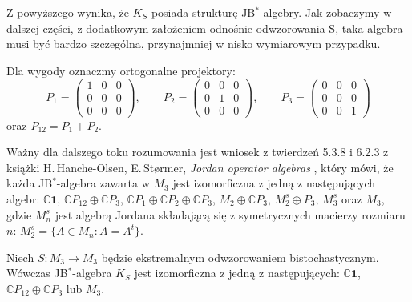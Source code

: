 Z powyższego wynika, że $K_{S}$ posiada strukturę JB$^{*}$-algebry.
Jak zobaczymy w dalszej części,
z dodatkowym założeniem odnośnie odwzorowania S,
taka algebra musi być bardzo szczególna,
przynajmniej w nisko wymiarowym przypadku.

Dla wygody oznaczmy ortogonalne projektory:
\begin{equation}
\label{def:OrthogonalProjections}
    P_{1} = \begin{pmatrix}
        1 & 0 & 0 \\
        0 & 0 & 0 \\
        0 & 0 & 0
    \end{pmatrix} , \quad \quad
    P_{2} = \begin{pmatrix}
        0 & 0 & 0 \\
        0 & 1 & 0 \\
        0 & 0 & 0
    \end{pmatrix} , \quad \quad
    P_{3} = \begin{pmatrix}
        0 & 0 & 0 \\
        0 & 0 & 0 \\
        0 & 0 & 1
    \end{pmatrix}
\end{equation}
oraz $P_{12} = P_{1} + P_{2}$.

Ważny dla dalszego toku rozumowania jest wniosek z twierdzeń 5.3.8 i 6.2.3
z książki
H.\,Hanche-Olsen, E.\,St{\o}rmer,
\emph{Jordan operator algebras} \cite{Hanche1984},
który mówi, że każda JB$^{*}$-algebra zawarta w $M_{3}$
jest izomorficzna z jedną z następujących algebr:
$\mathbb{C}\mathbf{1}$,
$\mathbb{C} P_{12} \oplus \mathbb{C} P_{3}$,
$\mathbb{C} P_{1} \oplus \mathbb{C} P_{2} \oplus \mathbb{C} P_{3}$,
$M_{2} \oplus \mathbb{C} P_{3}$,
$M_{2}^{s} \oplus P_{3}$,
$M_{3}^{s}$ oraz $M_{3}$,
gdzie $M_{n}^{s}$ jest algebrą Jordana składającą się z symetrycznych
macierzy rozmiaru $n$: $M_{2}^{s} = \{ A \in M_{n}: A = A^{t} \}$.

\begin{Theorem}
\label{thm:ExposedMaps}
Niech $S\!: M_{3} \rightarrow M_{3}$ będzie ekstremalnym odwzorowaniem
bistochastycznym.
Wówczas JB$^{*}$-algebra $K_{S}$ jest izomorficzna z jedną z następujących:
$\mathbb{C}\mathbf{1}$, $\mathbb{C} P_{12} \oplus \mathbb{C} P_{3}$
lub
$M_{3}$.
\end{Theorem}


